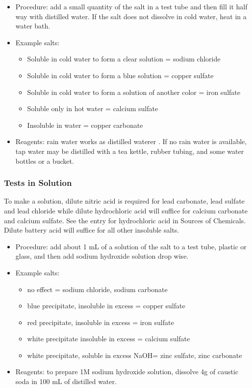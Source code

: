 \begin{itemize}
\item{Procedure: add a small quantity of the salt in a test tube 
and then fill it half way with distilled water. 
If the salt does not dissolve in cold water, 
heat in a water bath.}
\item{Example salts:}
\begin{itemize}
\item{Soluble in cold water to form a clear solution = sodium chloride}
\item{Soluble in cold water to form a blue solution = copper sulfate}
\item{Soluble in cold water to form a solution of another color = iron sulfate}
\item{Soluble only in hot water = calcium sulfate} 
\item{Insoluble in water = copper carbonate}
\end{itemize}
\item{Reagents: rain water works as distilled waterer . 
If no rain water is available, 
tap water may be distilled with a tea kettle, 
rubber tubing, 
and some water bottles or a bucket.}
\end{itemize}

\subsubsection{Tests in Solution}

To make a solution, 
dilute nitric acid is required for lead carbonate, 
lead sulfate and lead chloride 
while dilute hydrochloric acid will suffice 
for calcium carbonate and calcium sulfate. 
See the entry for hydrochloric acid in Sources of Chemicals. 
Dilute battery acid will suffice for all other insoluble salts. 

\begin{itemize}
\item{Procedure: add about 1 mL of a solution of the salt to a test tube, 
plastic or glass, 
and then add sodium hydroxide solution drop wise.}
\item{Example salts:}
\begin{itemize}
\item{no effect = sodium chloride, 
sodium carbonate}
\item{blue precipitate, 
insoluble in excess = copper sulfate}
\item{red precipitate, 
insoluble in excess = iron sulfate}
\item{white precipitate insoluble in excess = calcium sulfate}
\item{white precipitate, 
soluble in excess NaOH= zinc sulfate, 
zinc carbonate}
\end{itemize}
\item{Reagents: to prepare 1M sodium hydroxide solution, 
dissolve 4g of caustic soda in 100 mL of distilled water.}
\end{itemize}


